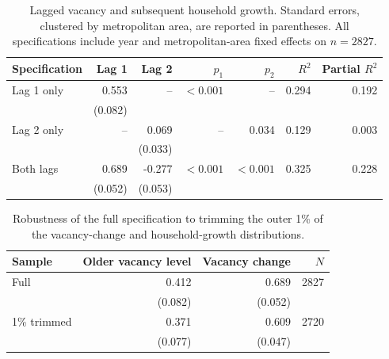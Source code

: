 \documentclass[11pt]{article}
\begin{document}
        \begin{table}[ht]
            \centering
            \begin{tabular}{lrrrrrr}
                \toprule
                Specification
                 & Lag 1 & Lag 2 & $p_1$ & $p_2$ & $R^2$ & Partial $R^2$ \\
                \midrule
                Lag 1 only & 0.553 & -- & $<0.001$ & -- & 0.294 & 0.192 \\
                 & (0.082) & & & & \\
                Lag 2 only & -- & 0.069 & -- & 0.034 & 0.129 & 0.003 \\
                 & & (0.033) & & & \\
                Both lags & 0.689 & -0.277 & $<0.001$ & $<0.001$ & 0.325 & 0.228 \\
                 & (0.052) & (0.053) & & & \\
                \bottomrule
            \end{tabular}
            \caption{Lagged vacancy and subsequent household growth. Standard errors,
            clustered by metropolitan area, are reported in parentheses. All specifications
            include year and metropolitan-area fixed effects on $n=2827$.}
            \label{tab:lag-models}
        \end{table}
        
        \begin{table}[ht]
            \centering
            \begin{tabular}{lrrr}
                \toprule
                Sample & Older vacancy level & Vacancy change & $N$ \\
                \midrule
                Full & 0.412 & 0.689 & 2827 \\
                 & (0.082) & (0.052) & \\
                1\% trimmed & 0.371 & 0.609 & 2720 \\
                 & (0.077) & (0.047) & \\
                \bottomrule
            \end{tabular}
            \caption{Robustness of the full specification to trimming the
            outer 1\% of the vacancy-change and household-growth distributions.}
            \label{tab:lag-trim}
        \end{table}
\end{document}
